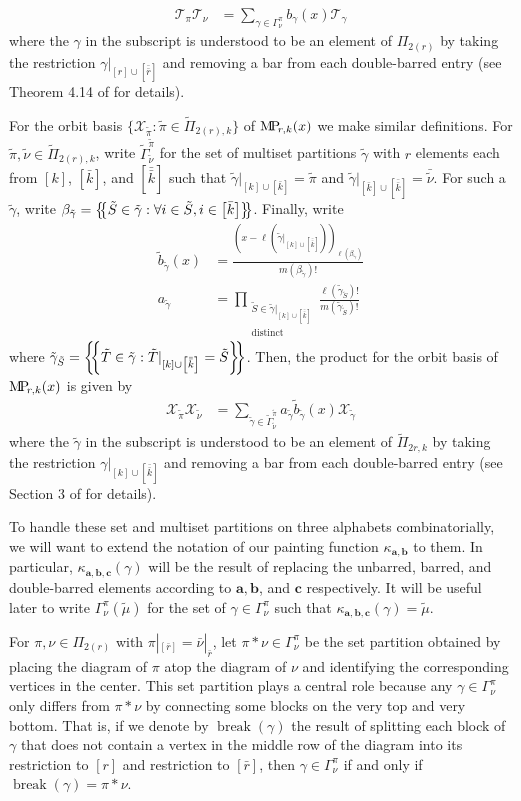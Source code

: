 \documentclass[ALCO,Unicode,published]{cedram}
\newcommand{\TT}{\mathcal{T}}
\newcommand{\XX}{\mathcal{X}}
\newcommand{\bfa}{{\boldsymbol{a}}}
\newcommand{\bfb}{{\boldsymbol{b}}}
\newcommand{\bfc}{{\boldsymbol{c}}}
\newcommand{\MP}{{\rm M\!P\!}}
\newcommand{\tpi}{{\tilde{\pi}}}
\newcommand{\tgamma}{{\tilde{\gamma}}}
\newcommand{\tmu}{{\tilde{\mu}}}
\newcommand{\tnu}{{\tilde{\nu}}}
\newcommand{\tS}{{\tilde{S}}}
\newcommand{\tT}{{\tilde{T}}}
\newcommand{\multi}[1]{\left\{\mskip-5mu\left\{#1\right\}\mskip-5mu\right\}}
\newcommand{\ov}[1]{\bar{#1}}
\newcommand{\ovb}[1]{\left[\ov{#1}\right]}
\newcommand{\ovov}[1]{\bar{\bar{#1}}}
\newcommand{\ovovb}[1]{\left[\ovov{#1}\right]}
\newcommand{\defn}[1]{\textcolor{defncolor}{\emph{#1}}}
\DeclareMathOperator{\Break}{break}
\begin{document}
\begin{align*}
    \TT_\pi \TT_\nu&=\sum_{\gamma\in\Gamma^\pi_\nu}b_\gamma(x)\TT_\gamma
\end{align*} where the $\gamma$ in the subscript is understood to be an element of $\Pi_{2(r)}$ by taking the restriction $\gamma|_{[r]\cup\ovovb{r}}$ and removing a bar from each double-barred entry (see Theorem 4.14 of \cite{Benkart2019PartitionAA} for details).

For the orbit basis $\{\XX_\tpi:\tpi\in\tilde\Pi_{2(r),k}\}$ of $\MP_{r,k}(x)$ we make similar definitions. For $\tpi,\tnu\in\tilde\Pi_{2(r),k}$, write $\tilde\Gamma^\tpi_\tnu$ for the set of multiset partitions $\tgamma$ with $r$ elements each from $[k]$, $\ovb{k}$, and $\ovovb{k}$ such that $\tgamma|_{[k]\cup\ovb{k}}=\tpi$ and $\tgamma|_{\ovb{k}\cup\ovovb{k}}=\ov\tnu$. For such a $\tgamma$, write $\beta_\tgamma=\multi{\tS\in\tgamma:\forall i\in \tS, i\in\ovb{k}}$. Finally, write \begin{align*}
    \tilde{b}_\tgamma(x)&=\frac{(x-\ell(\tgamma|_{[k]\cup\ovovb{k}}))_{\ell(\beta_\tgamma)}}{m(\beta_\tgamma)!}\\
    a_\tgamma&=\prod_{\substack{\tS\in\tgamma|_{[k]\cup\ovovb{k}}\\\text{distinct}}}\frac{\ell(\tgamma_\tS)!}{m(\tgamma_\tS)!}
\end{align*} where $\tgamma_\tS=\multi{\tT\in\tgamma:\tT|_{[k]\cup\ovovb{k}}=\tS}$. Then, the product for the orbit basis of $\MP_{r,k}(x)$ is given by \begin{align*}
    \XX_\tpi \XX_\tnu &=\sum_{\tgamma\in\tilde\Gamma^\tpi_\tnu} a_\tgamma \tilde{b}_\tgamma(x) \XX_\tgamma
\end{align*} where the $\tgamma$ in the subscript is understood to be an element of $\tilde{\Pi}_{2r,k}$ by taking the restriction $\gamma|_{[k]\cup\ovovb{k}}$ and removing a bar from each double-barred entry (see Section 3 of \cite{orellana2020howe} for details).

To handle these set and multiset partitions on three alphabets combinatorially, we will want to extend the notation of our painting function $\kappa_{\bfa,\bfb}$ to them. In particular, $\kappa_{\bfa,\bfb,\bfc}(\gamma)$ will be the result of replacing the unbarred, barred, and double-barred elements according to $\bfa,\bfb$, and $\bfc$ respectively. It will be useful later to write $\Gamma_\nu^\pi(\tmu)$ for the set of $\gamma\in\Gamma_\nu^\pi$ such that $\kappa_{\bfa,\bfb,\bfc}(\gamma)=\tmu$.

For $\pi,\nu\in\Pi_{2(r)}$ with $\pi|_{\ovb{r}}=\ov\nu|_{\ov r}$, let $\pi\ast\nu\in\Gamma^\pi_\nu$ be the set partition obtained by placing the diagram of $\pi$ atop the diagram of $\nu$ and identifying the corresponding vertices in the center. This set partition plays a central role because any $\gamma\in\Gamma^\pi_\nu$ only differs from $\pi\ast\nu$ by connecting some blocks on the very top and very bottom. That is, if we denote by \defn{$\Break(\gamma)$} the result of splitting each block of $\gamma$ that does not contain a vertex in the middle row of the diagram into its restriction to $[r]$ and restriction to $\ovb{r}$, then $\gamma\in\Gamma^\pi_\nu$ if and only if $\Break(\gamma)=\pi\ast\nu$.
\end{document}
